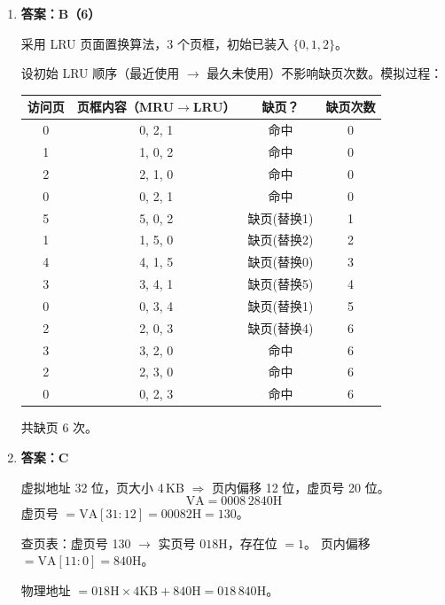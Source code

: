\documentclass[12pt,a4paper]{ctexart}
\begin{document}
\begin{enumerate}[leftmargin=*]
虚拟地址结构：补充位 25 + L1(9) + L2(9) + L3(9) + 页内偏移(12) = 64 位。

每级页表包含 $2^9 = 512$ 个页表项。64 位系统中每个页表项占 8\,B，故每级页表大小为：
\[
512 \times 8 = 4096\:\mathrm{B} = 4\:\mathrm{KB} = 1\ \text{页}
\]
因此每一级页表（包括第三级页表）恰好占用 1 个页框。

\item \textbf{答案：B（6）}

采用 LRU 页面置换算法，3 个页框，初始已装入 $\{0,1,2\}$。

设初始 LRU 顺序（最近使用 $\to$ 最久未使用）不影响缺页次数。模拟过程：

\begin{center}
\begin{tabular}{c|c|c|c}
访问页 & 页框内容（MRU$\to$LRU） & 缺页？ & 缺页次数 \\
\hline
0 & 0, 2, 1 & 命中 & 0 \\
1 & 1, 0, 2 & 命中 & 0 \\
2 & 2, 1, 0 & 命中 & 0 \\
0 & 0, 2, 1 & 命中 & 0 \\
5 & 5, 0, 2 & 缺页(替换1) & 1 \\
1 & 1, 5, 0 & 缺页(替换2) & 2 \\
4 & 4, 1, 5 & 缺页(替换0) & 3 \\
3 & 3, 4, 1 & 缺页(替换5) & 4 \\
0 & 0, 3, 4 & 缺页(替换1) & 5 \\
2 & 2, 0, 3 & 缺页(替换4) & 6 \\
3 & 3, 2, 0 & 命中 & 6 \\
2 & 2, 3, 0 & 命中 & 6 \\
0 & 0, 2, 3 & 命中 & 6 \\
\end{tabular}
\end{center}

共缺页 6 次。

\item \textbf{答案：C}

虚拟地址 32 位，页大小 4\,KB $\Rightarrow$ 页内偏移 12 位，虚页号 20 位。
\[
\mathrm{VA} = \mathrm{0008\,2840H}
\]
虚页号 $= \mathrm{VA}[31:12] = \mathrm{00082H} = 130$。

查页表：虚页号 130 $\to$ 实页号 $\mathrm{018H}$，存在位 $=1$。
页内偏移 $= \mathrm{VA}[11:0] = \mathrm{840H}$。

物理地址 $= \mathrm{018H} \times 4\mathrm{KB} + \mathrm{840H} = \mathrm{018\,840H}$。


\end{enumerate}
\end{document}
